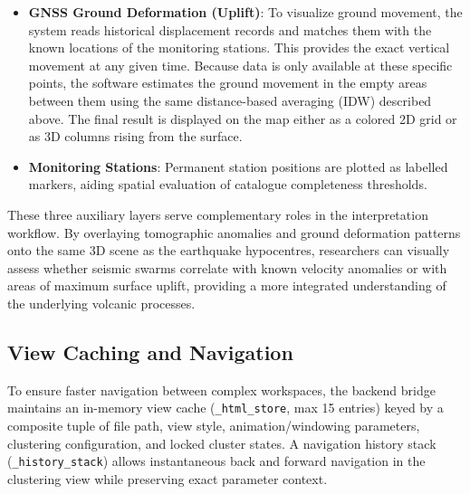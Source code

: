 \begin{itemize}
    \item \textbf{GNSS Ground Deformation (Uplift)}: To visualize ground movement, the system reads historical displacement records and matches them with the known locations of the monitoring stations. This provides the exact vertical movement at any given time. Because data is only available at these specific points, the software estimates the ground movement in the empty areas between them using the same distance-based averaging (IDW) described above. The final result is displayed on the map either as a colored 2D grid or as 3D columns rising from the surface.
    \item \textbf{Monitoring Stations}: Permanent station positions are plotted as labelled markers, aiding spatial evaluation of catalogue completeness thresholds.
\end{itemize}

These three auxiliary layers serve complementary roles in the interpretation workflow. By overlaying tomographic anomalies and ground deformation patterns onto the same 3D scene as the earthquake hypocentres, researchers can visually assess whether seismic swarms correlate with known velocity anomalies or with areas of maximum surface uplift, providing a more integrated understanding of the underlying volcanic processes.

\subsection{View Caching and Navigation}
\label{sec:view-caching}

To ensure faster navigation between complex workspaces, the backend bridge maintains an in-memory view cache (\texttt{\_html\_store}, max 15 entries) keyed by a composite tuple of file path, view style, animation/windowing parameters, clustering configuration, and locked cluster states. A navigation history stack (\texttt{\_history\_stack}) allows instantaneous back and forward navigation in the clustering view while preserving exact parameter context.
